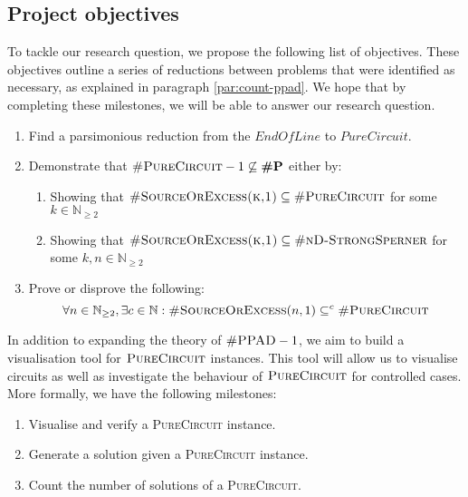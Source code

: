 \subsection{Project objectives}

To tackle our research question, we propose the following list of objectives. 
These objectives outline a series of reductions between problems that were identified as necessary,
as explained in paragraph \ref{par:count-ppad}.
We hope that by completing these milestones, we will be able to answer our research question.

\begin{enumerate}[label*=R.\arabic*)]
    \item Find a parsimonious reduction from the $\textit{EndOfLine}$ to $\textit{PureCircuit}$.
    \item Demonstrate that $\textsc{\#PureCircuit}- 1 \not\subseteq \textbf{\#P}$ either by:
        \begin{enumerate}
            \item Showing that $\textsc{\#SourceOrExcess(k,1)} \subseteq \textsc{\#PureCircuit}$ for some $k \in \mathbb{N}_{\geq 2}$
            \item Showing that $\textsc{\#SourceOrExcess(k,1)} \subseteq \textsc{\#nD-StrongSperner}$ for some $k,n \in \mathbb{N}_{\geq 2}$ 
        \end{enumerate}
    \item Prove or disprove the following:
\[
\forall n \in \mathbb{N}_{\geq 2}, \exists c \in \mathbb{N}:  \textnormal{\textsc{\#SourceOrExcess}}(n, 1) \subseteq^c \textnormal{\textsc{\#PureCircuit}}
\]

\end{enumerate}

In addition to expanding the theory of $\textsc{\#PPAD} -1$, we aim to build
a visualisation tool for $\textsc{PureCircuit}$ instances. This tool
will allow us to visualise circuits as well as investigate the behaviour
of $\textsc{PureCircuit}$ for controlled cases. More formally,
we have the following milestones:

\begin{enumerate}[label=S.\arabic*)]
    \item Visualise and verify a \textsc{PureCircuit} instance.
    \item Generate a solution given a \textsc{PureCircuit} instance.
    \item Count the number of solutions of a  \textsc{PureCircuit}.
\end{enumerate}

